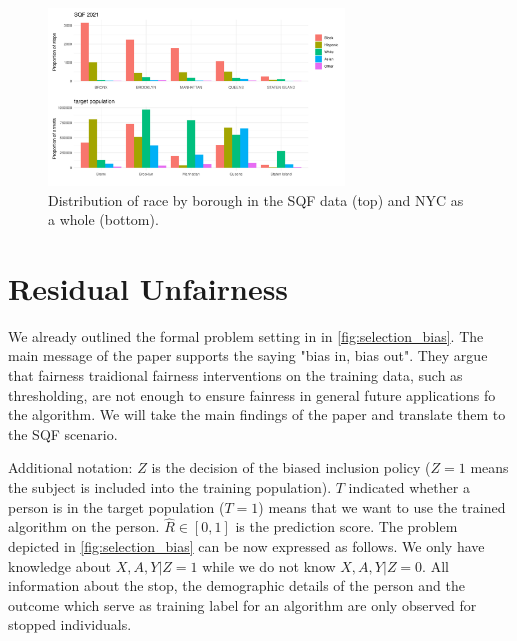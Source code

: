 \begin{figure}
    \centering
    \includegraphics[width=0.7\textwidth]{../figures/sqf_case_study_plot11.png}
    \caption {Distribution of race by borough in the SQF data (top) and NYC as a whole (bottom).}
    \label{fig:borough_race_distribution}
\end{figure}

\section{Residual Unfairness}
We already outlined the formal problem setting in \cite{kallus} in \autoref{fig:selection_bias}. The main message of the paper supports the saying "bias in, bias out". They argue that fairness traidional fairness interventions on the training data, such as thresholding, are not enough to ensure fainress in general future applications fo the algorithm. We will take the main findings of the paper and translate them to the SQF scenario.

Additional notation: $Z$ is the decision of the biased inclusion policy ($Z= 1$ means the subject is included into the training population). $T$ indicated whether a person is in the target population ($T = 1$) means that we want to use the trained algorithm on the person. $\hat{R} \in [0,1]$ is the prediction score.
The problem depicted in \autoref{fig:selection_bias} can be now expressed as follows. We only have knowledge about $X, A, Y | Z = 1$ while we do not know $X, A, Y | Z = 0$. All information about the stop, the demographic details of the person and the outcome which serve as training label for an algorithm are only observed for stopped individuals.

